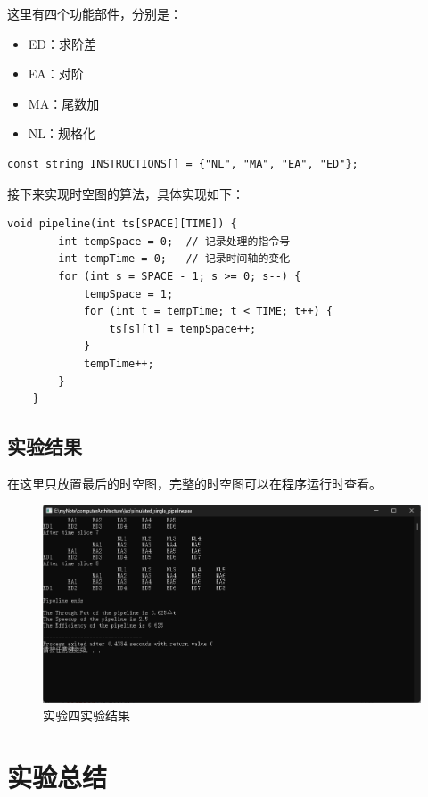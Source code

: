 \documentclass[UTF8,12pt]{article}
\begin{document}
这里有四个功能部件，分别是：

\begin{itemize}
    \item ED：求阶差 
    \item EA：对阶 
    \item MA：尾数加 
    \item NL：规格化
\end{itemize}

\begin{lstlisting}[frame=shadowbox]
    const string INSTRUCTIONS[] = {"NL", "MA", "EA", "ED"};
\end{lstlisting}

接下来实现时空图的算法，具体实现如下：

\begin{lstlisting}[frame=shadowbox]
    void pipeline(int ts[SPACE][TIME]) {
        int tempSpace = 0;  // 记录处理的指令号
        int tempTime = 0;   // 记录时间轴的变化
        for (int s = SPACE - 1; s >= 0; s--) {
            tempSpace = 1;
            for (int t = tempTime; t < TIME; t++) {
                ts[s][t] = tempSpace++;
            }
            tempTime++;
        }
    }
\end{lstlisting}

\subsection{实验结果}
在这里只放置最后的时空图，完整的时空图可以在程序运行时查看。

\begin{figure}[htbp]
    \centering
    \includegraphics[width=1.0\textwidth]{imgs/9.png}
    \caption{实验四实验结果}
\end{figure}


\newpage

\section{实验总结}
\end{document}
